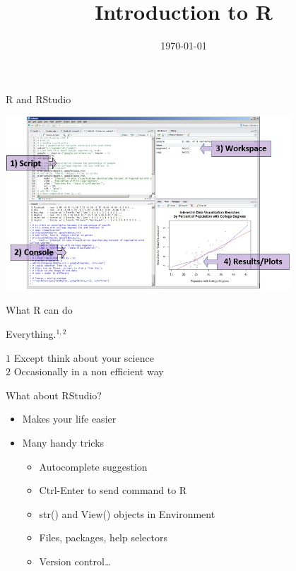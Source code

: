 \documentclass[10pt]{beamer}\usepackage[]{graphicx}\usepackage[]{color}
\title[\textbf{Intro to R}]{Introduction to R}
\date{\today}
\begin{document}
\begin{frame}
\maketitle	
\end{frame}

\begin{frame}{R and RStudio}
  \begin{center}
    \includegraphics[width=0.8\textwidth]{Figures/rstudiolayout}
  \end{center}
\end{frame}

\begin{frame}{What R can do}

  \pause \begin{exampleblock}{Everything.$^{1,2}$}

  {\tiny $1$ Except think about your science}\\
  {\tiny $2$ Occasionally in a non efficient way}
  \end{exampleblock}

  \pause \begin{block}{What about RStudio?}
  \begin{itemize}
    \item Makes your life easier
    \item Many handy tricks
      \begin{itemize}
        \item Autocomplete suggestion
        \item Ctrl-Enter to send command to R
        \item str() and View() objects in Environment
        \item Files, packages, help selectors
        \item Version control\dots
      \end{itemize}
    \end{itemize}
  \end{block}
  
\end{frame}
\end{document}
